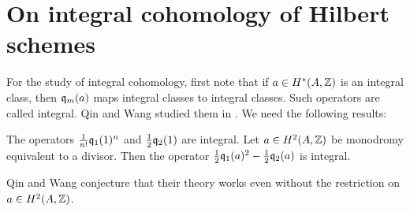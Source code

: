 

\section{On integral cohomology of Hilbert schemes}\label{basisHilb2}

For the study of integral cohomology, first note that if $a \in H^*(A,\mathbb{Z})$ is an integral class, then $\mathfrak{q}_{m}(a) $ maps integral classes to integral classes. Such operators are called integral. Qin and Wang studied them in \cite{QinWang}. We need the following results:

\begin{lemma} \cite{QinWang}\label{IntegralOperators}
The operators $\frac{1}{n!}\mathfrak{q}_1(1)^n$ and $\frac{1}{2}\mathfrak{q}_2(1) $ are integral.
Let $a\in H^2(A,\mathbb{Z})$ be monodromy equivalent to a divisor. Then the operator $\frac{1}{2}\mathfrak{q}_1(a)^2 - \frac{1}{2}\mathfrak{q}_2(a)$ is integral. 
\end{lemma}
\begin{remark}
Qin and Wang \cite[Thm 1.1 et seq.]{QinWang} conjecture that their theory works even without the restriction on $a\in H^2(A,\mathbb{Z})$. 
\end{remark}

